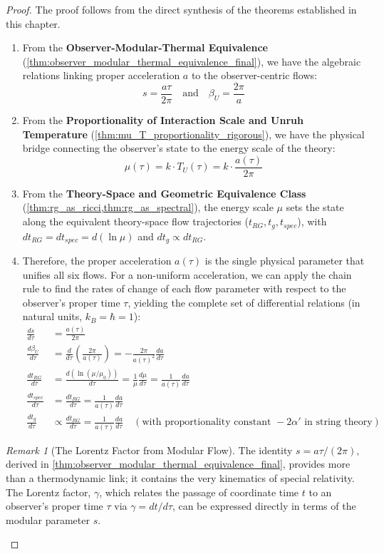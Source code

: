 \documentclass[11pt, letterpaper]{report}
\theoremstyle{plain} %
\theoremstyle{definition} %
\theoremstyle{remark} %
\newtheorem{remark}{Remark}[chapter]
\begin{document}
\begin{proof}
The proof follows from the direct synthesis of the theorems established in this chapter.
\begin{enumerate}
    \item From the \textbf{Observer-Modular-Thermal Equivalence} (\cref{thm:observer_modular_thermal_equivalence_final}), we have the algebraic relations linking proper acceleration $a$ to the observer-centric flows:
    $$ s = \frac{a\tau}{2\pi} \quad \text{and} \quad \beta_U = \frac{2\pi}{a} $$
    \item From the \textbf{Proportionality of Interaction Scale and Unruh Temperature} (\cref{thm:mu_T_proportionality_rigorous}), we have the physical bridge connecting the observer's state to the energy scale of the theory:
    $$ \mu(\tau) = k \cdot T_U(\tau) = k \cdot \frac{a(\tau)}{2\pi} $$
    \item From the \textbf{Theory-Space and Geometric Equivalence Class} (\cref{thm:rg_as_ricci,thm:rg_as_spectral}), the energy scale $\mu$ sets the state along the equivalent theory-space flow trajectories ($t_{RG}, t_g, t_{spec}$), with $dt_{RG} = dt_{spec} = d(\ln \mu)$ and $dt_g \propto dt_{RG}$.
    \item Therefore, the proper acceleration $a(\tau)$ is the single physical parameter that unifies all six flows. For a non-uniform acceleration, we can apply the chain rule to find the rates of change of each flow parameter with respect to the observer's proper time $\tau$, yielding the complete set of differential relations (in natural units, $k_B = \hbar = 1$):
    \begin{align}
        \frac{ds}{d\tau} &= \frac{a(\tau)}{2\pi} \\
        \frac{d\beta_U}{d\tau} &= \frac{d}{d\tau}\left(\frac{2\pi}{a(\tau)}\right) = -\frac{2\pi}{a(\tau)^2}\frac{da}{d\tau} \\
        \frac{dt_{RG}}{d\tau} &= \frac{d(\ln(\mu/\mu_0))}{d\tau} = \frac{1}{\mu}\frac{d\mu}{d\tau} = \frac{1}{a(\tau)}\frac{da}{d\tau} \\
        \frac{dt_{spec}}{d\tau} &= \frac{dt_{RG}}{d\tau} = \frac{1}{a(\tau)}\frac{da}{d\tau} \\
        \frac{dt_{g}}{d\tau} &\propto \frac{dt_{RG}}{d\tau} = \frac{1}{a(\tau)}\frac{da}{d\tau} \quad (\text{with proportionality constant } -2\alpha' \text{ in string theory})
    \end{align}
\end{enumerate}
\begin{remark}[The Lorentz Factor from Modular Flow]
The identity $s = a\tau/(2\pi)$, derived in \cref{thm:observer_modular_thermal_equivalence_final}, provides more than a thermodynamic link; it contains the very kinematics of special relativity. The Lorentz factor, $\gamma$, which relates the passage of coordinate time $t$ to an observer's proper time $\tau$ via $\gamma = dt/d\tau$, can be expressed directly in terms of the modular parameter $s$.


\end{remark}
\end{proof}
\end{document}
